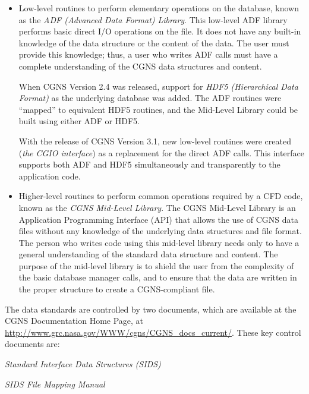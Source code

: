 \begin{itemize}
\item Low-level routines to perform elementary operations on the
     database, known as the \textit{ADF (Advanced Data Format) Library}.
     This low-level ADF library performs basic direct I/O operations on
     the file.
     It does not have any built-in knowledge of the data structure or
     the content of the data.
     The user must provide this knowledge; thus, a user who writes
     ADF calls must have a complete understanding of the CGNS data
     structures and content.

      When CGNS Version 2.4 was released, support for
      \textit{HDF5 (Hierarchical Data Format)}
      as the underlying database was added.
      The ADF routines were ``mapped'' to equivalent HDF5
      routines, and the Mid-Level Library could be built using
      either ADF or HDF5.

      With the release of CGNS Version 3.1, new low-level routines
      were created (\textit{the CGIO interface})
      as a replacement for the direct ADF calls. This interface supports
      both ADF and HDF5 simultaneously
      and transparently to the application code.
\item Higher-level routines to perform common operations required by a
      CFD code, known as the \textit{CGNS Mid-Level Library}.
      The CGNS Mid-Level Library is an Application Programming Interface
      (API) that allows the use of CGNS data files without any knowledge
      of the underlying data structures and file format.
      The person who writes code using this mid-level library needs only
      to have a general understanding of the standard data structure and
      content.
      The purpose of the mid-level library is to shield the user from
      the complexity of the basic database manager calls,
      and to ensure that the data
      are written in the proper structure to create a CGNS-compliant
      file.
\end{itemize}

The data standards are controlled by two documents, which are available
at the CGNS Documentation Home Page, at
\url{http://www.grc.nasa.gov/WWW/cgns/CGNS_docs_current/}.
These key control documents are:

\begin{itemize*}
\item \textit{Standard Interface Data Structures (SIDS)}
\item \textit{SIDS File Mapping Manual}
\end{itemize*}

